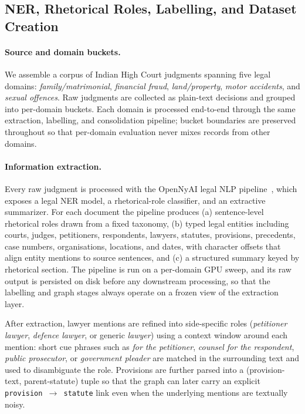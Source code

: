 \documentclass[runningheads]{llncs}
\begin{document}
\subsection{NER, Rhetorical Roles, Labelling, and Dataset Creation}
\label{subsec:pipeline-data}

\paragraph{Source and domain buckets.}
We assemble a corpus of Indian High Court judgments spanning five legal domains: \emph{family/matrimonial}, \emph{financial fraud}, \emph{land/property}, \emph{motor accidents}, and \emph{sexual offences}. Raw judgments are collected as plain-text decisions and grouped into per-domain buckets. Each domain is processed end-to-end through the same extraction, labelling, and consolidation pipeline; bucket boundaries are preserved throughout so that per-domain evaluation never mixes records from other domains.

\paragraph{Information extraction.}
Every raw judgment is processed with the OpenNyAI legal NLP pipeline~\cite{kalamkar2022opennyai}, which exposes a legal NER model, a rhetorical-role classifier, and an extractive summarizer. For each document the pipeline produces (a) sentence-level rhetorical roles drawn from a fixed taxonomy, (b) typed legal entities including courts, judges, petitioners, respondents, lawyers, statutes, provisions, precedents, case numbers, organisations, locations, and dates, with character offsets that align entity mentions to source sentences, and (c) a structured summary keyed by rhetorical section. The pipeline is run on a per-domain GPU sweep, and its raw output is persisted on disk before any downstream processing, so that the labelling and graph stages always operate on a frozen view of the extraction layer.

After extraction, lawyer mentions are refined into side-specific roles (\emph{petitioner lawyer}, \emph{defence lawyer}, or generic \emph{lawyer}) using a context window around each mention: short cue phrases such as \emph{for the petitioner}, \emph{counsel for the respondent}, \emph{public prosecutor}, or \emph{government pleader} are matched in the surrounding text and used to disambiguate the role. Provisions are further parsed into a (provision-text, parent-statute) tuple so that the graph can later carry an explicit \texttt{provision $\rightarrow$ statute} link even when the underlying mentions are textually noisy.
\end{document}
